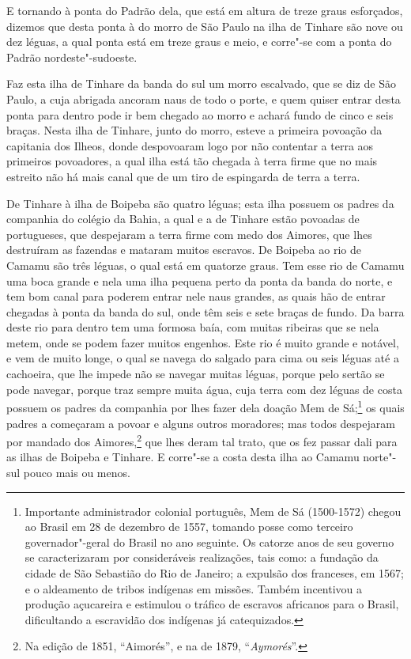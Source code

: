 E tornando à ponta do Padrão dela, que está em altura de treze graus esforçados, dizemos
que desta ponta à do morro de São Paulo na ilha de Tinhare são nove ou dez léguas, a qual
ponta está em treze graus e meio, e corre"-se com a ponta do Padrão nordeste"-sudoeste.

Faz esta ilha de Tinhare da banda do sul um morro escalvado, que se diz de São Paulo, a
cuja abrigada ancoram naus de todo o porte, e quem quiser entrar desta ponta para dentro
pode ir bem chegado ao morro e achará fundo de cinco e seis braças. Nesta ilha de Tinhare,
junto do morro, esteve a primeira povoação da capitania dos Ilheos, donde despovoaram logo
por não contentar a terra aos primeiros povoadores, a qual ilha está tão chegada à terra
firme que no mais estreito não há mais canal que de um tiro de espingarda de terra a
terra.

De Tinhare à ilha de Boipeba são quatro léguas; esta ilha possuem os padres da companhia
do colégio da Bahia, a qual e a de Tinhare estão povoadas de portugueses, que despejaram a
terra firme com medo dos Aimores, que lhes destruíram as fazendas e mataram muitos
escravos. De Boipeba ao rio de Camamu são três léguas, o qual está em quatorze graus. Tem
esse rio de Camamu uma boca grande e nela uma ilha pequena perto da ponta da banda do
norte, e tem bom canal para poderem entrar nele naus grandes, as quais hão de entrar
chegadas à ponta da banda do sul, onde têm seis e sete braças de fundo. Da barra deste rio
para dentro tem uma formosa baía, com muitas ribeiras que se nela metem, onde se podem
fazer muitos engenhos. Este rio é muito grande e notável, e vem de muito longe, o qual se
navega do salgado para cima ou seis léguas até a cachoeira, que lhe impede não se navegar
muitas léguas, porque pelo sertão se pode navegar, porque traz sempre muita água, cuja
terra com dez léguas de costa possuem os padres da companhia por lhes fazer dela doação
Mem de Sá;\footnote{ Importante administrador colonial português, Mem de Sá (1500-1572)
chegou ao Brasil em 28 de dezembro de 1557, tomando posse como terceiro governador"-geral
do Brasil no ano seguinte. Os catorze anos de seu governo se caracterizaram por
consideráveis realizações, tais como: a fundação da cidade de São Sebastião do Rio de
Janeiro; a expulsão dos franceses, em 1567; e o aldeamento de tribos indígenas em missões.
Também incentivou a produção açucareira e estimulou o tráfico de escravos africanos para o
Brasil, dificultando a escravidão dos indígenas já catequizados.} os quais padres a
começaram a povoar e alguns outros moradores; mas todos despejaram por mandado dos
Aimores,\footnote{ Na edição de 1851, ``Aimorés'', e na de 1879, ``\textit{Aymorés}''.}
que lhes deram tal trato, que os fez passar dali para as ilhas de Boipeba e Tinhare. E
corre"-se a costa desta ilha ao Camamu norte"-sul pouco mais ou menos.

